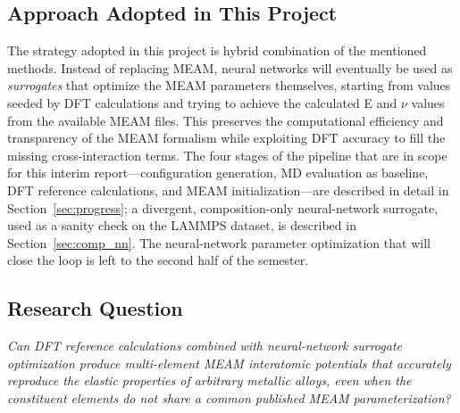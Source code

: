 \subsection{Approach Adopted in This Project}
The strategy adopted in this project is hybrid combination of the mentioned methods. Instead of replacing MEAM, neural
networks will eventually be used as \emph{surrogates} that optimize the MEAM
parameters themselves, starting from values seeded by DFT calculations and trying to achieve the calculated E and $\nu$ values from the available MEAM files. This
preserves the computational efficiency and transparency of the MEAM formalism
while exploiting DFT accuracy to fill the missing cross-interaction terms.
The four stages of the pipeline that are in scope for this interim
report---configuration generation, MD evaluation as baseline, DFT reference
calculations, and MEAM initialization---are described in detail in
Section~\ref{sec:progress}; a divergent, composition-only neural-network
surrogate, used as a sanity check on the LAMMPS dataset, is described in
Section~\ref{sec:comp_nn}. The neural-network parameter optimization that will 
close the loop is left to the second half of the semester.

\subsection{Research Question}
\textit{Can DFT reference calculations combined with neural-network surrogate
optimization produce multi-element MEAM interatomic potentials that accurately
reproduce the elastic properties of arbitrary metallic alloys, even when the
constituent elements do not share a common published MEAM parameterization?}
